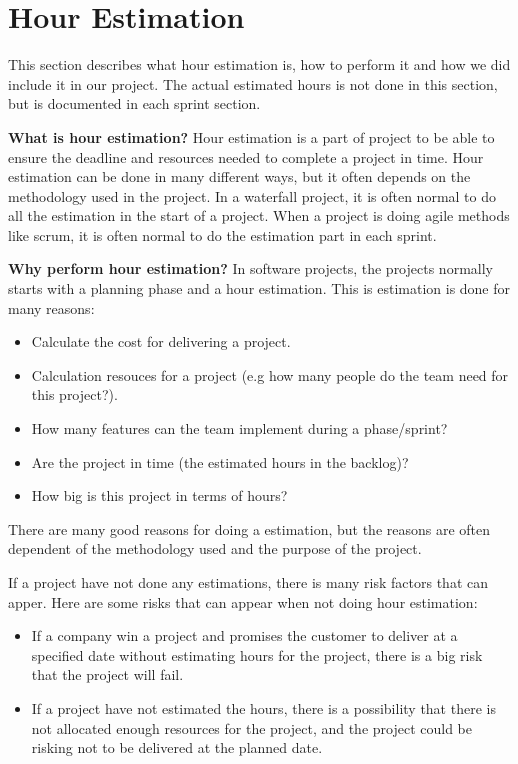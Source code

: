 \section{Hour Estimation}

	This section describes what hour estimation is, how to perform it and how we did 
	include it in our project. The actual estimated hours is not done in this section, 
	but is documented in each sprint section.

	{\bf What is hour estimation?} Hour estimation is a part of project to be able to ensure the 
	deadline and resources needed to complete a project in time.
	Hour estimation can be done in many different ways, but it often depends on the methodology
	used in the project. 
	In a waterfall project, it is often normal to do all the estimation in the start of a project.
	When a project is doing agile methods like scrum, it is often normal to do the estimation part
	in each sprint. \cite{estimation}

	{\bf Why perform hour estimation?} In software projects, the projects normally starts with
	a planning phase and a hour estimation. This is estimation is done for many reasons:
		\begin{itemize}
			\item Calculate the cost for delivering a project.
			\item Calculation resouces for a project (e.g how many people do the team 
			need for this project?).
			\item How many features can the team implement during a phase/sprint?
			\item Are the project in time (the estimated hours in the backlog)?
			\item How big is this project in terms of hours?
		\end{itemize}
	There are many good reasons for doing a estimation, but the reasons are often dependent
	of the methodology used and the purpose of the project. 

	If a project have not done any estimations, there is many risk factors that can apper. 
	Here are some risks that can appear when not doing hour estimation:
	\begin{itemize}
		\item If a company win a project and promises the customer to deliver at a 
		specified date without estimating hours for the project, there is a big risk 
		that the project will fail.
		\item If a project have not estimated the hours, there is a possibility that 
		there is not allocated enough resources for the project, and the project could 
		be risking not to be delivered at the planned date.  
	\end{itemize}


